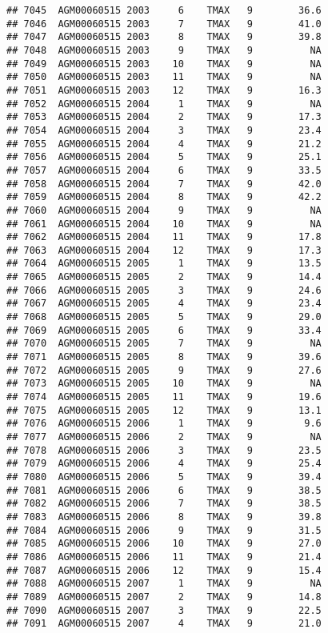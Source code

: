 \documentclass{article}\usepackage[]{graphicx}\usepackage[]{color}
\makeatletter
\newenvironment{kframe}{%
 \def\at@end@of@kframe{}%
 \ifinner\ifhmode%
  \def\at@end@of@kframe{\end{minipage}}%
  \begin{minipage}{\columnwidth}%
 \fi\fi%
 \def\FrameCommand##1{\hskip\@totalleftmargin \hskip-\fboxsep
 \colorbox{shadecolor}{##1}\hskip-\fboxsep
     \hskip-\linewidth \hskip-\@totalleftmargin \hskip\columnwidth}%
 \MakeFramed {\advance\hsize-\width
   \@totalleftmargin\z@ \linewidth\hsize
   \@setminipage}}%
 {\par\unskip\endMakeFramed%
 \at@end@of@kframe}
\newenvironment{knitrout}{}{} %
\makeatother
\begin{document}
\begin{knitrout}
\begin{kframe}
\begin{verbatim}
## 7045  AGM00060515 2003     6    TMAX   9        36.6
## 7046  AGM00060515 2003     7    TMAX   9        41.0
## 7047  AGM00060515 2003     8    TMAX   9        39.8
## 7048  AGM00060515 2003     9    TMAX   9          NA
## 7049  AGM00060515 2003    10    TMAX   9          NA
## 7050  AGM00060515 2003    11    TMAX   9          NA
## 7051  AGM00060515 2003    12    TMAX   9        16.3
## 7052  AGM00060515 2004     1    TMAX   9          NA
## 7053  AGM00060515 2004     2    TMAX   9        17.3
## 7054  AGM00060515 2004     3    TMAX   9        23.4
## 7055  AGM00060515 2004     4    TMAX   9        21.2
## 7056  AGM00060515 2004     5    TMAX   9        25.1
## 7057  AGM00060515 2004     6    TMAX   9        33.5
## 7058  AGM00060515 2004     7    TMAX   9        42.0
## 7059  AGM00060515 2004     8    TMAX   9        42.2
## 7060  AGM00060515 2004     9    TMAX   9          NA
## 7061  AGM00060515 2004    10    TMAX   9          NA
## 7062  AGM00060515 2004    11    TMAX   9        17.8
## 7063  AGM00060515 2004    12    TMAX   9        17.3
## 7064  AGM00060515 2005     1    TMAX   9        13.5
## 7065  AGM00060515 2005     2    TMAX   9        14.4
## 7066  AGM00060515 2005     3    TMAX   9        24.6
## 7067  AGM00060515 2005     4    TMAX   9        23.4
## 7068  AGM00060515 2005     5    TMAX   9        29.0
## 7069  AGM00060515 2005     6    TMAX   9        33.4
## 7070  AGM00060515 2005     7    TMAX   9          NA
## 7071  AGM00060515 2005     8    TMAX   9        39.6
## 7072  AGM00060515 2005     9    TMAX   9        27.6
## 7073  AGM00060515 2005    10    TMAX   9          NA
## 7074  AGM00060515 2005    11    TMAX   9        19.6
## 7075  AGM00060515 2005    12    TMAX   9        13.1
## 7076  AGM00060515 2006     1    TMAX   9         9.6
## 7077  AGM00060515 2006     2    TMAX   9          NA
## 7078  AGM00060515 2006     3    TMAX   9        23.5
## 7079  AGM00060515 2006     4    TMAX   9        25.4
## 7080  AGM00060515 2006     5    TMAX   9        39.4
## 7081  AGM00060515 2006     6    TMAX   9        38.5
## 7082  AGM00060515 2006     7    TMAX   9        38.5
## 7083  AGM00060515 2006     8    TMAX   9        39.8
## 7084  AGM00060515 2006     9    TMAX   9        31.5
## 7085  AGM00060515 2006    10    TMAX   9        27.0
## 7086  AGM00060515 2006    11    TMAX   9        21.4
## 7087  AGM00060515 2006    12    TMAX   9        15.4
## 7088  AGM00060515 2007     1    TMAX   9          NA
## 7089  AGM00060515 2007     2    TMAX   9        14.8
## 7090  AGM00060515 2007     3    TMAX   9        22.5
## 7091  AGM00060515 2007     4    TMAX   9        21.0

\end{verbatim}
\end{kframe}
\end{knitrout}
\end{document}
